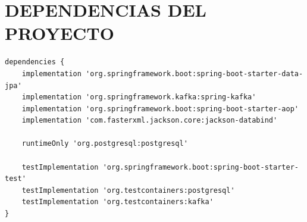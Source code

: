 \section{DEPENDENCIAS DEL PROYECTO}

\begin{lstlisting}[caption={Dependencias principales en build.gradle.}]
dependencies {
    implementation 'org.springframework.boot:spring-boot-starter-data-jpa'
    implementation 'org.springframework.kafka:spring-kafka'
    implementation 'org.springframework.boot:spring-boot-starter-aop'
    implementation 'com.fasterxml.jackson.core:jackson-databind'

    runtimeOnly 'org.postgresql:postgresql'

    testImplementation 'org.springframework.boot:spring-boot-starter-test'
    testImplementation 'org.testcontainers:postgresql'
    testImplementation 'org.testcontainers:kafka'
}
\end{lstlisting}
